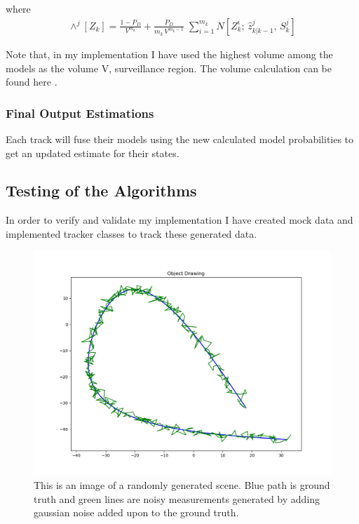 \documentclass[peerreview]{IEEEtran}
\begin{document}
where
\begin{equation}
\begin{aligned}
\wedge^j[Z_k] = \frac{1 - P_D}{V^{m_k}} + \frac{P_D}{m_k \, V^{m_k -1}} \; \sum\limits_{i=1}^{m_k} N[Z^i_k; \, \hat{z}^j_{k|k-1}, \, S^j_k] 
\end{aligned}
\end{equation}

Note that, in my implementation I have used the highest volume among the models as the volume V, surveillance region. The volume calculation can be found here \cite[p.130]{BYL95}.

\vspace{10px}

\subsubsection{Final Output Estimations}

Each track will fuse their models using the new calculated model probabilities to get an updated estimate for their states.


\subsection{Testing of the Algorithms}
In order to verify and validate my implementation I have created mock data and implemented tracker classes to track these generated data.

\begin{figure}[htbp]
\centerline{\includegraphics[scale=.3]{mockData.png}}
\caption{This is an image of a randomly generated scene. Blue path is ground truth and green lines are noisy measurements generated by adding gaussian noise added upon to the ground truth.}
\label{fig}
\end{figure}
\end{document}
